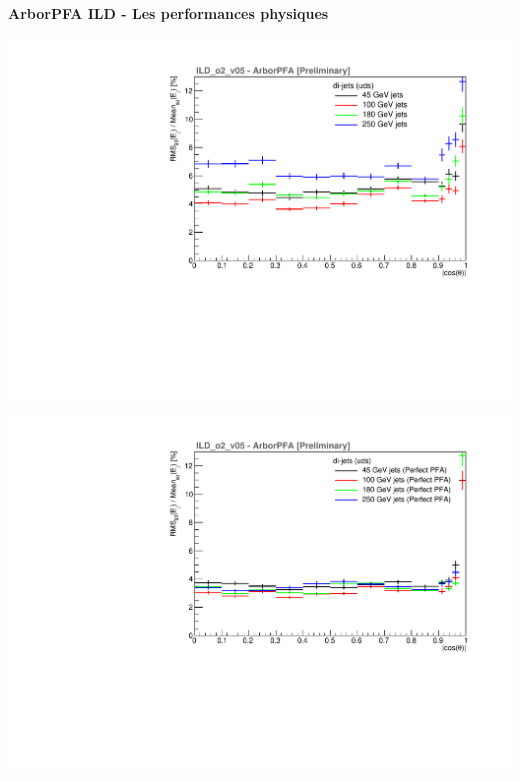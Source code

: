 \documentclass[8pt]{beamer}
\begin{document}
  \begin{frame}
  \frametitle{\backup}
  \framesubtitle{ArborPFA ILD - Les performances physiques}
    \begin{minipage}{0.49\linewidth}
      \begin{center}
        \includegraphics[width=\linewidth]{ILDArborPFA_Resolution_NoNeutralHadron.pdf}
      \end{center}
    \end{minipage}
    \begin{minipage}{0.49\linewidth}
      \begin{center}
        \includegraphics[width=\linewidth]{ILDArborPFA_PerfectResolution_NoNeutralHadron.pdf}
      \end{center}
    \end{minipage}
  \end{frame}
\end{document}

